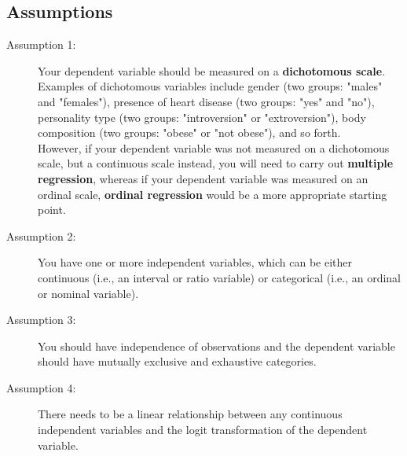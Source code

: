 \documentclass[12pt, a4paper]{article}
\theoremstyle{plain}
\theoremstyle{definition}
\theoremstyle{remark}
\begin{document}
%
%
\newpage
\subsection{Assumptions}

\begin{description}
	\item[Assumption 1:] Your dependent variable should be measured on a \textbf{dichotomous scale}. Examples of dichotomous variables include gender (two groups: "males" and "females"), presence of heart disease (two groups: "yes" and "no"), personality type (two groups: "introversion" or "extroversion"), body composition (two groups: "obese" or "not obese"), and so forth. \\
	\newline
	However, if your dependent variable was not measured on a dichotomous scale, but a continuous scale instead, you will need to carry out \textbf{multiple regression}, whereas if your dependent variable was measured on an ordinal scale, \textbf{ordinal regression} would be a more appropriate starting point.
	
	\item[Assumption 2:] You have one or more independent variables, which can be either continuous (i.e., an interval or ratio variable) or categorical (i.e., an ordinal or nominal variable). 
	
	
	
	\item[Assumption 3:] You should have independence of observations and the dependent variable should have mutually exclusive and exhaustive categories.
	
	\item[Assumption 4:] There needs to be a linear relationship between any continuous independent variables and the logit transformation of the dependent variable. 
\end{description}
\end{document}
